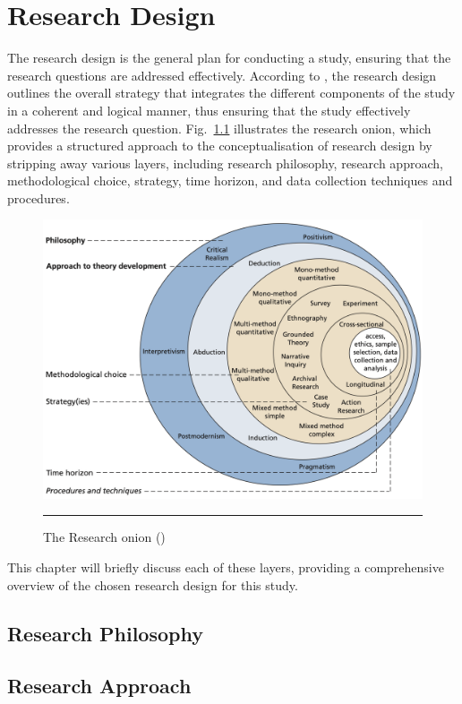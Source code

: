 \chapter{Research Design}\label{chap:research-design}

The research design is the general plan for conducting a study, ensuring that the research questions are addressed effectively.
According to \textcite{SaundersMark2023}, the research design outlines the overall strategy that integrates the different components of the study in a coherent and logical manner, thus ensuring that the study effectively addresses the research question.
Fig.~\ref{fig:research-onion} illustrates the research onion, which provides a structured approach to the conceptualisation of research design by stripping away various layers, including research philosophy, research approach, methodological choice, strategy, time horizon, and data collection techniques and procedures.

\begin{figure}[htbp]
    \centering
 \includegraphics[width=.8\textwidth]{figures/research-design/research-onion.png}
     \rule{35em}{0.5pt}
    \caption{The Research onion (\textcite{SaundersMark2023})} 
 \label{fig:research-onion}
\end{figure}

This chapter will briefly discuss each of these layers, providing a comprehensive overview of the chosen research design for this study.

\section{Research Philosophy}\label{sec:research-philosophy}

%
\section{Research Approach}\label{sec:research-approach}

%
